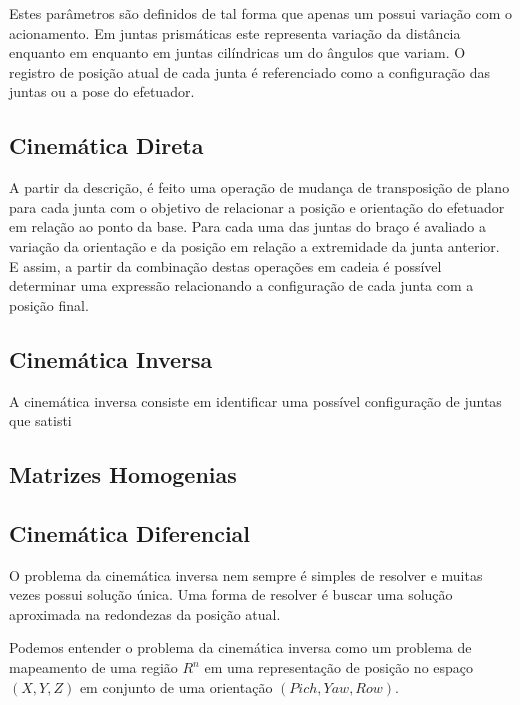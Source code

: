 
Estes parâmetros são definidos de tal forma que apenas um possui variação com o acionamento. Em juntas prismáticas este representa variação da distância enquanto em enquanto em juntas cilíndricas um do ângulos que variam. O registro de posição atual de cada junta é referenciado como a configuração das juntas ou a pose do efetuador.

\subsection{Cinemática Direta}

A partir da descrição, é feito uma operação de mudança de transposição de plano para cada junta com o objetivo de relacionar a posição e orientação do efetuador em relação ao ponto da base. Para cada uma das juntas do braço é avaliado a variação da orientação e da posição em relação a extremidade da junta anterior. E assim, a partir da combinação destas operações em cadeia é possível determinar uma expressão relacionando a configuração de cada junta com a posição final.

\subsection{Cinemática Inversa}

A cinemática inversa consiste em identificar uma possível configuração de juntas que satisti

\subsection{Matrizes Homogenias}

\subsection{Cinemática Diferencial}

O problema da cinemática inversa nem sempre é simples de resolver e muitas vezes possui solução única. Uma forma de resolver é buscar uma solução aproximada na redondezas da posição atual.

Podemos entender o problema da cinemática inversa como um problema de mapeamento de uma região $R^n$ em uma representação de posição no espaço $(X,Y,Z)$ em conjunto de uma orientação $(Pich, Yaw, Row)$.


